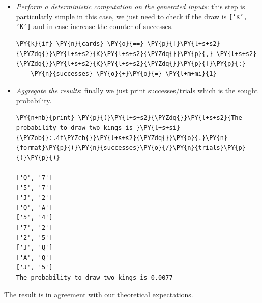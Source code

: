 \begin{itemize}
\begin{tcolorbox}[breakable, size=fbox, boxrule=1pt, pad at break*=1mm,colback=cellbackground, colframe=cellborder]
\begin{Verbatim}[commandchars=\\\{\}]
\PY{k}{for} \PY{n}{i} \PY{o+ow}{in} \PY{n+nb}{range}\PY{p}{(}\PY{n}{trials}\PY{p}{)}\PY{p}{:}
  \PY{n}{cards} \PY{o}{=} \PY{n}{sample}\PY{p}{(}\PY{n}{deck}\PY{p}{,} \PY{n}{k}\PY{o}{=}\PY{l+m+mi}{2}\PY{p}{)}
  \PY{k}{if} \PY{n}{i} \PY{o}{\PYZlt{}} \PY{l+m+mi}{10}\PY{p}{:}
    \PY{n+nb}{print} \PY{p}{(}\PY{n}{cards}\PY{p}{)}
\end{Verbatim}
\end{tcolorbox}

\item \emph{Perform a deterministic computation on the generated inputs}: this step is particularly simple in this case, we just need to check if the draw is \texttt{['K', 'K']} and in case increase the counter of successes.

\begin{tcolorbox}[breakable, size=fbox, boxrule=1pt, pad at break*=1mm,colback=cellbackground, colframe=cellborder]
\begin{Verbatim}[commandchars=\\\{\}]
  \PY{k}{if} \PY{n}{cards} \PY{o}{==} \PY{p}{[}\PY{l+s+s2}{\PYZdq{}}\PY{l+s+s2}{K}\PY{l+s+s2}{\PYZdq{}}\PY{p}{,} \PY{l+s+s2}{\PYZdq{}}\PY{l+s+s2}{K}\PY{l+s+s2}{\PYZdq{}}\PY{p}{]}\PY{p}{:}
    \PY{n}{successes} \PY{o}{+}\PY{o}{=} \PY{l+m+mi}{1}
 \end{Verbatim}
\end{tcolorbox}

\item \emph{Aggregate the results}: finally we just print successes/trials which is the sought probability.

\begin{tcolorbox}[breakable, size=fbox, boxrule=1pt, pad at break*=1mm,colback=cellbackground, colframe=cellborder]
\begin{Verbatim}[commandchars=\\\{\}]
\PY{n+nb}{print} \PY{p}{(}\PY{l+s+s2}{\PYZdq{}}\PY{l+s+s2}{The probability to draw two kings is }\PY{l+s+si}{\PYZob{}:.4f\PYZcb{}}\PY{l+s+s2}{\PYZdq{}}\PY{o}{.}\PY{n}{format}\PY{p}{(}\PY{n}{successes}\PY{o}{/}\PY{n}{trials}\PY{p}{)}\PY{p}{)}

['Q', '7']
['5', '7']
['J', '2']
['Q', 'A']
['5', '4']
['7', '2']
['2', '5']
['J', 'Q']
['A', 'Q']
['J', '5']
The probability to draw two kings is 0.0077
    \end{Verbatim}
\end{tcolorbox}
\end{itemize}
The result is in agreement with our theoretical expectations.

